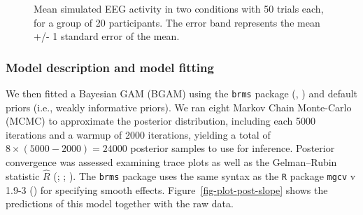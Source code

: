 \documentclass[
  doc,
  floatsintext,
  longtable,
  a4paper,
  nolmodern,
  notxfonts,
  notimes,
  colorlinks=true,linkcolor=blue,citecolor=blue,urlcolor=blue]{apa7}
\begin{document}
\begin{figure}[!htb]

\caption{\label{fig-eeg}Mean simulated EEG activity in two conditions
with 50 trials each, for a group of 20 participants. The error band
represents the mean +/- 1 standard error of the mean.}


\end{figure}%

\subsubsection{Model description and model
fitting}\label{model-description-and-model-fitting}

We then fitted a Bayesian GAM (BGAM) using the \texttt{brms} package
(, )
and default priors (i.e., weakly informative priors). We ran eight
Markov Chain Monte-Carlo (MCMC) to approximate the posterior
distribution, including each 5000 iterations and a warmup of 2000
iterations, yielding a total of \(8 \times (5000-2000) = 24000\)
posterior samples to use for inference. Posterior convergence was
assessed examining trace plots as well as the Gelman--Rubin statistic
\(\hat{R}\) (;
;
). The \texttt{brms}
package uses the same syntax as the \texttt{R} package \texttt{mgcv} v
1.9-3 () for specifying smooth effects.
Figure~\ref{fig-plot-post-slope} shows the predictions of this model
together with the raw data.
\end{document}
